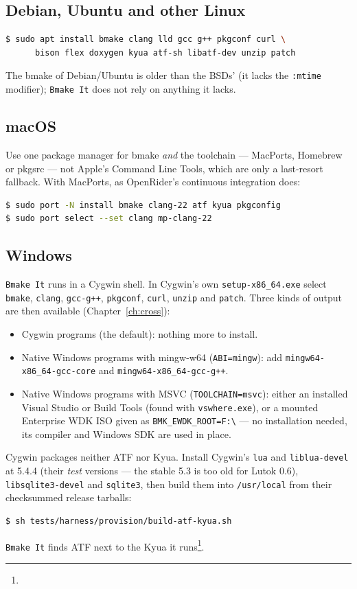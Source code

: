 \documentclass[11pt]{report}
\newcommand{\reqfoot}[1]{\footnote{\footnotesize\seqsplit{#1}}}
\begin{document}
\subsection*{Debian, Ubuntu and other Linux}
\begin{lstlisting}[language=bash]
$ sudo apt install bmake clang lld gcc g++ pkgconf curl \
      bison flex doxygen kyua atf-sh libatf-dev unzip patch
\end{lstlisting}
The bmake of Debian/Ubuntu is older than the BSDs' (it lacks the
\verb|:mtime| modifier); \texttt{Bmake It} does not rely on anything it
lacks.

\subsection*{macOS}
Use one package manager for bmake \emph{and} the toolchain --- MacPorts,
Homebrew or pkgsrc --- not Apple's Command Line Tools, which are only a
last-resort fallback. With MacPorts, as OpenRider's continuous
integration does:
\begin{lstlisting}[language=bash]
$ sudo port -N install bmake clang-22 atf kyua pkgconfig
$ sudo port select --set clang mp-clang-22
\end{lstlisting}

\subsection*{Windows}
\texttt{Bmake It} runs in a Cygwin shell. In Cygwin's own
\verb|setup-x86_64.exe| select \texttt{bmake}, \texttt{clang},
\texttt{gcc-g++}, \texttt{pkgconf}, \texttt{curl}, \texttt{unzip} and
\texttt{patch}. Three kinds of output are then available
(Chapter~\ref{ch:cross}):
\begin{itemize}
\item Cygwin programs (the default): nothing more to install.
\item Native Windows programs with mingw-w64 (\verb|ABI=mingw|): add
  \texttt{mingw64-x86\_64-gcc-core} and \texttt{mingw64-x86\_64-gcc-g++}.
\item Native Windows programs with MSVC (\verb|TOOLCHAIN=msvc|): either
  an installed Visual Studio or Build Tools (found with
  \texttt{vswhere.exe}), or a mounted Enterprise WDK ISO given as
  \verb|BMK_EWDK_ROOT=F:\| --- no installation needed, its compiler and
  Windows SDK are used in place.
\end{itemize}
Cygwin packages neither ATF nor Kyua. Install Cygwin's \texttt{lua} and
\texttt{liblua-devel} at 5.4.4 (their \emph{test} versions --- the
stable 5.3 is too old for Lutok 0.6), \texttt{libsqlite3-devel} and
\texttt{sqlite3}, then build them into \verb|/usr/local| from their
checksummed release tarballs:
\begin{lstlisting}[language=bash]
$ sh tests/harness/provision/build-atf-kyua.sh
\end{lstlisting}
\texttt{Bmake It} finds ATF next to the Kyua it
runs\reqfoot{REQ-atf-from-kyua-prefix-req}.
\end{document}
